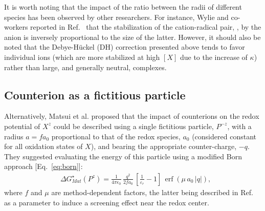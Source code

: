 \documentclass[review,preprint]{elsarticle}
\DeclareMathOperator{\erf}{erf}
\begin{document}
It is worth noting that the impact of the ratio between the radii of different species has been observed by other researchers. For instance, Wylie and co-workers reported in Ref.~ that the stabilization of the cation-radical pair, , by the anion is inversely proportional to the size of the latter. However, it should also be noted that the Debye-Hückel (DH) correction presented above tends to favor individual ions (which are more stabilized at high $[X]$ due to the increase of $\kappa$) rather than large, and generally neutral, complexes.


\subsection{Counterion as a fictitious particle}

Alternatively, Matsui et al. \cite{matsuiDensityFunctionalTheory2013} proposed that the impact of counterions on the redox potential of $X^z$ could be described using a single fictitious particle, $P^{-z}$, with a radius $a=fa_0$ proportional to that of the redox species, $a_0$ (considered constant for all oxidation states of $X$), and bearing the appropriate counter-charge, $-q$. They suggested evaluating the energy of this particle using a modified Born approach [Eq.~\eqref{eq:born}]:\begin{align}
	&\Delta G^\star_{Mat}(P^z) = \frac{1}{4\pi\epsilon_0}\, \frac{q^2}{2fa_0}\,\left[\frac{1}{\varepsilon_r}-1\right]\,\erf(\mu\,a_0\,|q|),
\end{align}
where $f$ and $\mu$ are method-dependent factors, the latter being described in Ref.~\cite{matsuiDensityFunctionalTheory2013} as a parameter to induce a screening effect near the redox center.
\end{document}
